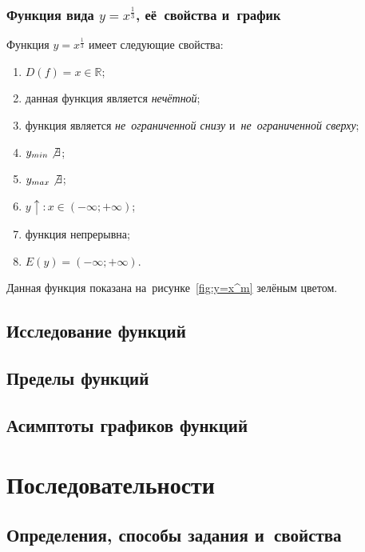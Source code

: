 \documentclass[]{scrartcl}
\begin{document}
{{\subsubsection{Функция вида ${\textstyle y=x^{\frac{1}{3}}}$, её~свойства и~график}
Функция ${\textstyle y=x^{\frac{1}{3}}}$ имеет следующие свойства:
\begin{enumerate}
	\item ${\textstyle D(f)=x \in \mathbb{R}}$;
	\item данная функция является \emph{нечётной};
	\item функция является \emph{не~ограниченной снизу} и~\emph{не~ограниченной сверху};
	\item ${\textstyle y_{min}\not \exists}$;
	\item ${\textstyle y_{max}\not \exists}$;
	\item ${\textstyle y\uparrow:x\in (-\infty;+\infty)}$;
	\item функция непрерывна;
	\item ${\textstyle E(y)=(-\infty;+\infty)}$.
\end{enumerate}
Данная функция показана на~рисунке~\ref{fig:y=x^m} зелёным цветом.

\subsection{Исследование функций}
\subsection{Пределы функций}
\subsection{Асимптоты графиков функций}

\section{Последовательности}
\subsection{Определения, способы задания и~свойства}
}}
\end{document}
